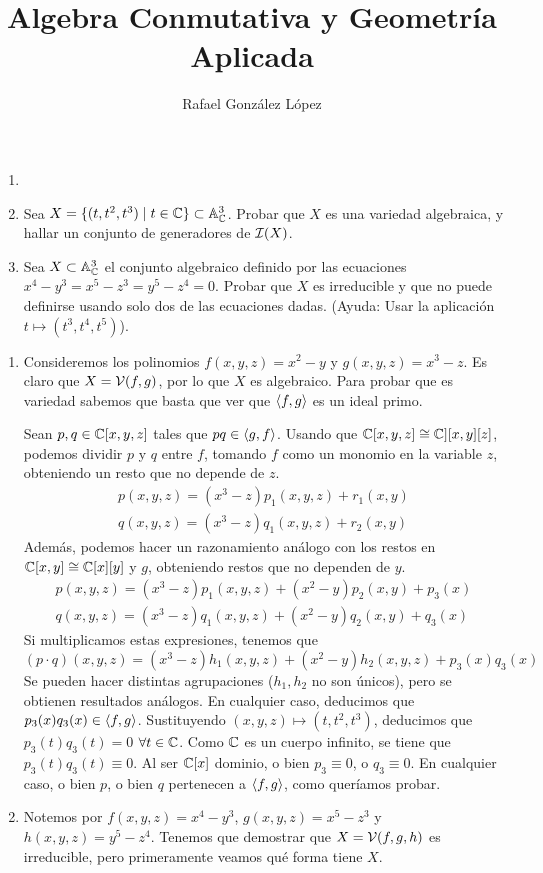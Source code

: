 \documentclass[twoside]{article}
\begin{document}
\title{Algebra Conmutativa y Geometría Aplicada}
\author{Rafael González López}
\maketitle

\begin{ejercicio}{6}
\begin{enumerate}
\item[]
\item Sea $X=\{(t,t^2,t^3)\mid t\in\mathbb{C}\} \subset \mathbb{A}^3_{\mathbb{C}}$. Probar que $X$ es una variedad algebraica, y hallar un conjunto de generadores de $\mathcal{I}(X)$.
\item Sea $X\subset \mathbb{A}^3_{\mathbb{C}}$ el conjunto algebraico definido por las ecuaciones $x^4-y^3=x^5-z^3= y^5 -z^4 = 0$. Probar que $X$ es irreducible y que no puede definirse usando solo dos de las ecuaciones dadas. (Ayuda: Usar la aplicación $t\mapsto (t^3,t^4,t^5)$).
\end{enumerate} 
\begin{solucion}
\item[]
\begin{enumerate}
\item Consideremos los polinomios $f(x,y,z) = x^2-y$ y $g(x,y,z)=x^3-z$. Es claro que $X=\mathcal{V}(f,g)$, por lo que $X$ es algebraico. Para probar que es variedad sabemos que basta que ver que $\langle{f,g}\rangle$ es un ideal primo.

Sean $p,q\in\mathbb{C}[x,y,z]$ tales que $pq\in \langle{g,f}\rangle$. Usando que $\mathbb{C}[x,y,z] \cong \mathbb{C}][x,y][z]$, podemos dividir $p$ y $q$ entre $f$, tomando $f$ como un monomio en la variable $z$, obteniendo un resto que no depende de $z$. 
\begin{gather*}
p(x,y,z)=(x^3-z)p_1(x,y,z) + r_1(x,y)\\
q(x,y,z)=(x^3-z)q_1(x,y,z) + r_2(x,y)
\end{gather*}
Además, podemos hacer un razonamiento análogo con los restos en $\mathbb{C}[x,y]\cong \mathbb{C}[x][y]$ y $g$, obteniendo restos que no dependen de $y$. 
\begin{gather*}
p(x,y,z)=(x^3-z)p_1(x,y,z) + (x^2-y)p_2(x,y) + p_3(x)\\
q(x,y,z)=(x^3-z)q_1(x,y,z) + (x^2-y)q_2(x,y) + q_3(x)
\end{gather*}
Si multiplicamos estas expresiones, tenemos que
\[
(p\cdot q)(x,y,z) = (x^3-z)h_1(x,y,z)+(x^2-y)h_2(x,y,z) + p_3(x)q_3(x)
\]
Se pueden hacer distintas agrupaciones ($h_1,h_2$ no son únicos), pero se obtienen resultados análogos. En cualquier caso, deducimos que $p_3(x)q_3(x)\in \langle{f,g}\rangle$. Sustituyendo $(x,y,z)\mapsto(t,t^2,t^3)$, deducimos que $p_3(t)q_3(t)=0$ $\forall t\in \mathbb{C}$. Como $\mathbb{C}$ es un cuerpo infinito, se tiene que $p_3(t)q_3(t)\equiv 0$. Al ser $\mathbb{C}[x]$ dominio, o bien $p_3 \equiv 0$, o $q_3 \equiv 0$. En cualquier caso, o bien $p$, o bien $q$ pertenecen a $\langle{f,g}\rangle$, como queríamos probar.
\item Notemos por $f(x,y,z)=x^4-y^3$, $g(x,y,z)=x^5-z^3$ y $h(x,y,z)=y^5-z^4$. Tenemos que demostrar que $X=\mathcal{V}(f,g,h)$ es irreducible, pero primeramente veamos qué forma tiene $X$.


\end{enumerate}
\end{solucion}
\end{ejercicio}
\end{document}
